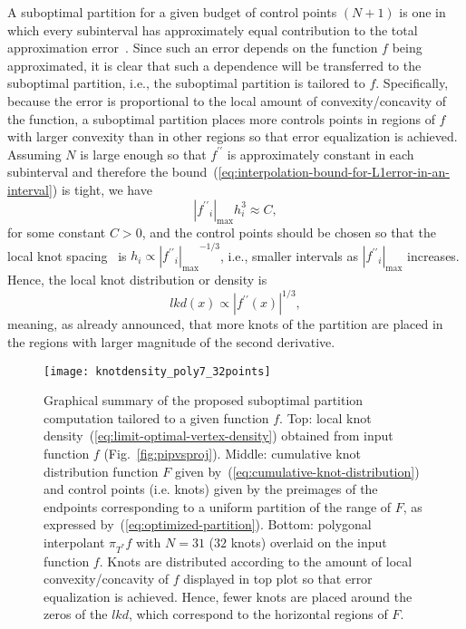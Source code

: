 \documentclass[a4paper,english]{IEEEtran}
\begin{document}
A suboptimal partition for a given budget of control points $(N+1)$
is one in which every subinterval has approximately equal contribution
to the total approximation error~\cite{deBoor2001,Cox2001}. Since
such an error depends on the function $f$ being approximated, it
is clear that such a dependence will be transferred to the suboptimal
partition, i.e., the suboptimal partition is tailored to $f$. Specifically,
because the error is proportional to the local amount of convexity/concavity
of the function, a suboptimal partition places more controls points
in regions of ${f}$ with larger convexity than in other regions so
that error equalization is achieved. Assuming $N$ is large enough
so that ${{f}^{\prime\prime}}$ is approximately constant in each subinterval and
therefore the bound~(\ref{eq:interpolation-bound-for-L1error-in-an-interval})
is tight, we have
\begin{equation}
{|{{f}^{\prime\prime}}_{i}|_{\max}} h_{i}^{3}\approx C,\label{eq:ErrorEqualization}
\end{equation}
for some constant $C>0$, and the control points should be chosen
so that the local knot spacing~\cite{Cox2001} is $h_{i}\propto{|{{f}^{\prime\prime}}_{i}|_{\max}}^{-1/3}$,
i.e., smaller intervals as ${|{{f}^{\prime\prime}}_{i}|_{\max}}$ increases. Hence, the local knot
distribution or density is 
\begin{equation}
lkd(x)\propto|{{f}^{\prime\prime}}(x)|^{1/3},\label{eq:limit-optimal-vertex-density}
\end{equation}
meaning, as already announced, that more knots of the partition are
placed in the regions with larger magnitude of the second derivative.
\begin{figure}
\centering{}\texttt{[image: knotdensity\_poly7\_32points]}\caption{\textbf{\label{fig:GraphicalSummary}}Graphical summary of the proposed
suboptimal partition computation tailored to a given function $f$.
Top: local knot density~(\ref{eq:limit-optimal-vertex-density})
obtained from input function $f$ (Fig.~\ref{fig:pipvsproj}). Middle:
cumulative knot distribution function $F$ given by~(\ref{eq:cumulative-knot-distribution})
and control points (i.e. knots) given by the preimages of the endpoints
corresponding to a uniform partition of the range of $F$, as expressed
by~(\ref{eq:optimized-partition}). Bottom: polygonal interpolant
${\pi_{{T}^{\ast}}} f$ with $N=31$ ($32$ knots) overlaid on the input function
$f$. Knots are distributed according to the amount of local convexity/concavity
of $f$ displayed in top plot so that error equalization is achieved.
Hence, fewer knots are placed around the zeros of the $lkd$, which
correspond to the horizontal regions of $F$.}
\end{figure}
\end{document}
